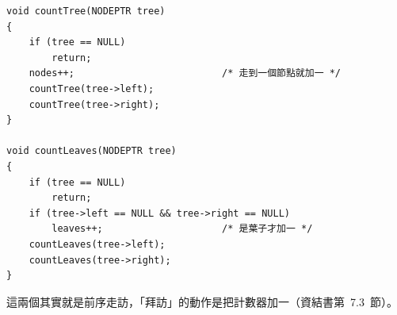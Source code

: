 \begin{pastsoln}
\begin{verbatim}
void countTree(NODEPTR tree)
{
    if (tree == NULL)
        return;
    nodes++;                          /* 走到一個節點就加一 */
    countTree(tree->left);
    countTree(tree->right);
}

void countLeaves(NODEPTR tree)
{
    if (tree == NULL)
        return;
    if (tree->left == NULL && tree->right == NULL)
        leaves++;                     /* 是葉子才加一 */
    countLeaves(tree->left);
    countLeaves(tree->right);
}
\end{verbatim}
這兩個其實就是前序走訪，「拜訪」的動作是把計數器加一（資結書第~7.3~節）。
\end{pastsoln}
